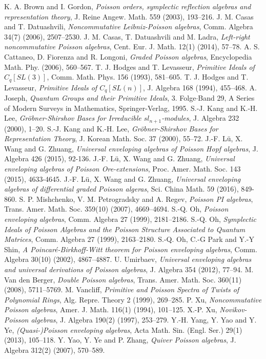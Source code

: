 \documentclass[a4paper,10pt]{amsart}
\theoremstyle{definition}
\theoremstyle{remark}
\numberwithin{equation}{section}
\begin{document}
\bigskip

\begin{thebibliography}{10}
 K. A. Brown and I. Gordon, \emph{Poisson orders, symplectic reflection algebras and representation theory}, J. Reine Angew. Math. 559 (2003), 193--216.
 J. M. Casas and T. Datuashvili, \emph{Noncommutative Leibniz-Poisson algebras}, Comm. Algebra 34(7) (2006), 2507--2530.
 J. M. Casas, T. Datuashvili and M. Ladra, \emph{Left-right noncommutative Poisson algebras}, Cent. Eur. J. Math. 12(1) (2014), 57--78.
 A. S. Cattaneo, D. Fiorenza and R. Longoni, \emph{Graded Poisson algebras}, Encyclopedia Math. Phy. (2006), 560--567.
 T. J. Hodges and T. Levasseur, \emph{Primitive Ideals of $C_q[SL(3)]$}, Comm. Math. Phys. 156 (1993), 581--605.
 T. J. Hodges and T. Levasseur, \emph{Primitive Ideals of $C_q[SL(n)]$}, J. Algebra 168 (1994), 455--468.
 A. Joseph, \emph{Quantum Groups and their Primitive Ideals}, 3. Folge$\cdot$Band 29, A Series of Modern Surveys in Mathematics, Springer-Verlag, 1995.
 S.-J. Kang and K.-H. Lee, \emph{Gr\"{o}bner-Shirshov Bases for Irreducible $sl_{n+1}$-modules}, J. Algebra 232 (2000), 1--20.
 S.-J. Kang and K.-H. Lee, \emph{Gr\"{o}bner-Shirshov Bases for Representation Theory}, J. Korean Math. Soc. 37 (2000), 55--72.
 J.-F. L\"u, X. Wang and G. Zhuang, {\it Universal enveloping algebras of Poisson Hopf algebras}, J. Algebra 426 (2015), 92-136.
 J.-F. L\"u, X. Wang and G. Zhuang, {\it Universal enveloping algebras of Poisson Ore-extensions}, Proc. Amer. Math. Soc. 143 (2015), 4633-4645.
 J.-F. L\"{u}, X. Wang and G. Zhuang, \emph{Universal
enveloping algebras of differential graded Poisson algeras}, Sci. China Math. 59 (2016), 849-860.
 S. P. Mishchenko, V. M. Petrogradsky and A. Regev, \emph{Poisson PI algebras}, Trans. Amer. Math. Soc. 359(10) (2007), 4669--4694.
 S.-Q. Oh, \emph{Poisson enveloping algebras}, Comm. Algebra 27 (1999), 2181--2186.
 S.-Q. Oh, \emph{Symplectic Ideals of Poisson Algebras and the Poisson Structure Associated to Quantum Matrices}, Comm. Algebra 27 (1999), 2163--2180.
 S.-Q. Oh, C.-G Park and Y.-Y Shin, \emph{A Poincar\'{e}-Birkhoff-Witt theorem for Poisson enveloping algebras}, Comm. Algebra 30(10) (2002), 4867--4887.
 U. Umirbaev, \emph{Universal enveloping algebras and universal derivations of Poisson algebras}, J. Algebra 354 (2012), 77--94.
 M. Van den Berger, \emph{Double Poisson algebras}, Trans. Amer. Math. Soc. 360(11) (2008), 5711--5769.
 M. Vancliff, \emph{Primitive and Poisson Spectra of Twists of Polynomial Rings}, Alg. Repre. Theory 2 (1999), 269--285.
 P. Xu, \emph{Noncommutative Poisson algebras}, Amer. J. Math. 116(1) (1994), 101--125.
 X.-P. Xu, \emph{Novikov-Poisson algebras}, J. Algebra 190(2) (1997), 253--279.
 Y.-H. Yang, Y. Yao and Y. Ye, \emph{(Quasi-)Poisson enveloping algebras}, Acta Math. Sin. (Engl. Ser.) 29(1) (2013), 105--118.
 Y. Yao, Y. Ye and P. Zhang, \emph{Quiver Poisson algebras}, J. Algebra 312(2) (2007), 570--589.
\end{thebibliography}
\end{document}
